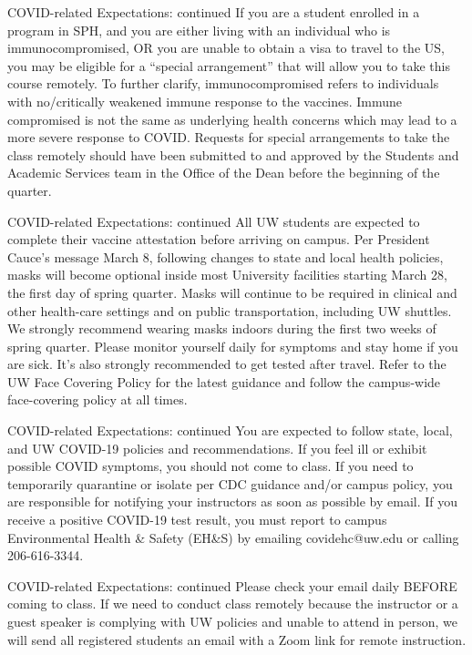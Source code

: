 \documentclass[10pt,t]{beamer}
\begin{document}
\begin{frame}{COVID-related Expectations: continued}
If you are a student enrolled in a program in SPH, and you are either living with an individual who is immunocompromised, OR you are unable to obtain a visa to travel to the US, you may be eligible for a “special arrangement” that will allow you to take this course remotely. To further clarify, immunocompromised refers to individuals with no/critically weakened immune response to the vaccines. Immune compromised is not the same as underlying health concerns which may lead to a more severe response to COVID. Requests for special arrangements to take the class remotely should have been submitted to and approved by the Students and Academic Services team in the Office of the Dean before the beginning of the quarter.
\end{frame}

\begin{frame}{COVID-related Expectations: continued}
All UW students are expected to complete their vaccine attestation before arriving on campus. Per President Cauce’s message March 8,  following changes to state and local health policies, masks will become optional inside most University facilities starting March 28, the first day of spring quarter. Masks will continue to be required in clinical and other health-care settings and on public transportation, including UW shuttles. We strongly recommend wearing masks indoors during the first two weeks of spring quarter. Please monitor yourself daily for symptoms and stay home if you are sick. It’s also strongly recommended to get tested after travel. Refer to the UW Face Covering Policy for the latest guidance and follow the campus-wide face-covering policy at all times. 
\end{frame}

\begin{frame}{COVID-related Expectations: continued}
You are expected to follow state, local, and UW COVID-19 policies and recommendations. If you feel ill or exhibit possible COVID symptoms, you should not come to class. If you need to temporarily quarantine or isolate per CDC guidance and/or campus policy, you are responsible for notifying your instructors as soon as possible by email. If you receive a positive COVID-19 test result, you must report to campus Environmental Health \& Safety (EH\&S) by emailing covidehc@uw.edu or calling 206-616-3344. 
\end{frame}

\begin{frame}{COVID-related Expectations: continued}
Please check your email daily BEFORE coming to class. If we need to conduct class remotely because the instructor or a guest speaker is complying with UW policies and unable to attend in person, we will send all registered students an email with a Zoom link for remote instruction.
\end{frame}
\end{document}

